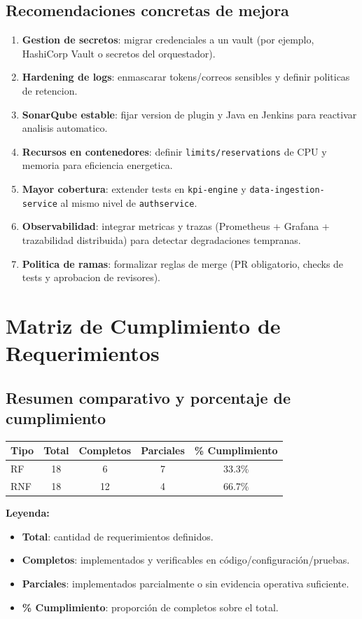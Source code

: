 \documentclass[12pt,a4paper]{article}
\begin{document}
\subsection{Recomendaciones concretas de mejora}
\begin{enumerate}[leftmargin=*]
    \item \textbf{Gestion de secretos}: migrar credenciales a un vault (por ejemplo, HashiCorp Vault o secretos del orquestador).
    \item \textbf{Hardening de logs}: enmascarar tokens/correos sensibles y definir politicas de retencion.
    \item \textbf{SonarQube estable}: fijar version de plugin y Java en Jenkins para reactivar analisis automatico.
    \item \textbf{Recursos en contenedores}: definir \texttt{limits/reservations} de CPU y memoria para eficiencia energetica.
    \item \textbf{Mayor cobertura}: extender tests en \texttt{kpi-engine} y \texttt{data-ingestion-service} al mismo nivel de \texttt{authservice}.
    \item \textbf{Observabilidad}: integrar metricas y trazas (Prometheus + Grafana + trazabilidad distribuida) para detectar degradaciones tempranas.
    \item \textbf{Politica de ramas}: formalizar reglas de merge (PR obligatorio, checks de tests y aprobacion de revisores).
\end{enumerate}

\section{Matriz de Cumplimiento de Requerimientos}
\subsection{Resumen comparativo y porcentaje de cumplimiento}
\begin{longtable}{lcccc}
\toprule
\textbf{Tipo} & \textbf{Total} & \textbf{Completos} & \textbf{Parciales} & \textbf{\% Cumplimiento} \\
\midrule
RF & 18 & 6 & 7 & 33.3\% \\
RNF & 18 & 12 & 4 & 66.7\% \\
\bottomrule
\end{longtable}

\noindent
\textbf{Leyenda:}
\begin{itemize}[leftmargin=*]
    \item \textbf{Total}: cantidad de requerimientos definidos.
    \item \textbf{Completos}: implementados y verificables en código/configuración/pruebas.
    \item \textbf{Parciales}: implementados parcialmente o sin evidencia operativa suficiente.
    \item \textbf{\% Cumplimiento}: proporción de completos sobre el total.
\end{itemize}
\end{document}
